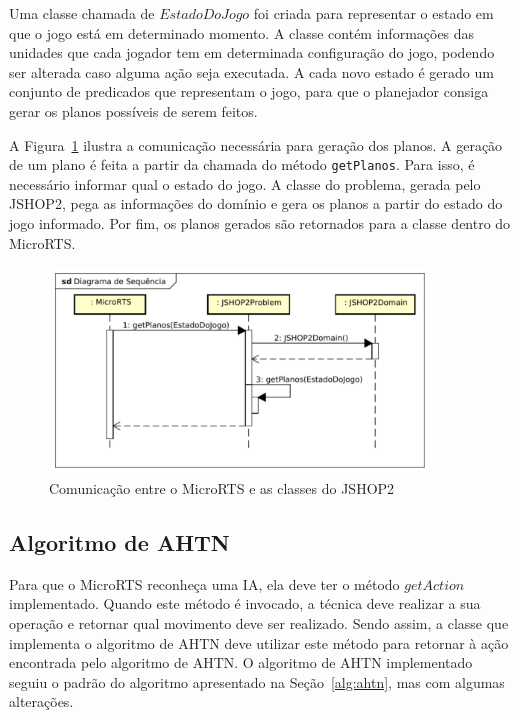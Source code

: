 Uma classe chamada de $EstadoDoJogo$ foi criada para representar o estado em que o jogo está em determinado momento.
A classe contém informações das unidades que cada jogador tem em determinada configuração do jogo, podendo ser alterada caso alguma ação seja executada.
A cada novo estado é gerado um conjunto de predicados que representam o jogo, para que o planejador consiga gerar os planos possíveis de serem feitos.

A Figura~\ref{fig:planos} ilustra a comunicação necessária para geração dos planos.
A geração de um plano é feita a partir da chamada do método \texttt{getPlanos}.
Para isso, é necessário informar qual o estado do jogo.
A classe do problema, gerada pelo JSHOP2, pega as informações do domínio e gera os planos a partir do estado do jogo informado.
Por fim, os planos gerados são retornados para a classe dentro do MicroRTS.

\begin{figure}[ht]
	\centering
	\includegraphics[width=0.9\textwidth]{fig/gerarPlano.pdf}
	\caption{Comunicação entre o MicroRTS e as classes do JSHOP2}
	\label{fig:planos}
\end{figure}

\subsection{Algoritmo de AHTN}

Para que o MicroRTS reconheça uma IA, ela deve ter o método $\mathit{getAction}$ implementado.
Quando este método é invocado, a técnica deve realizar a sua operação e retornar qual movimento deve ser realizado.
Sendo assim, a classe que implementa o algoritmo de AHTN deve utilizar este método para retornar à ação encontrada pelo algoritmo de AHTN.
O algoritmo de AHTN implementado seguiu o padrão do algoritmo apresentado na Seção~\ref{alg:ahtn}, mas com algumas alterações.

